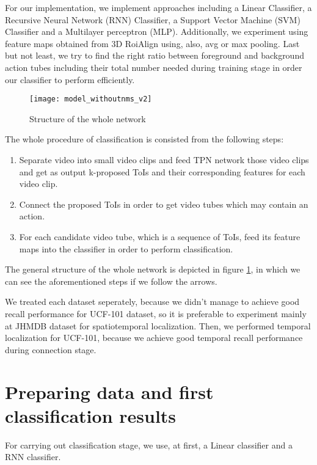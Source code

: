 For our implementation, we implement approaches including a Linear Classifier, 
a Recursive Neural Network (RNN) Classifier, a Support Vector Machine (SVM) Classifier and a Multilayer perceptron (MLP).
Additionally, we experiment using feature maps obtained from 3D RoiAlign using, also, avg or max pooling. Last but not least, we try to
find the right ratio between foreground and background action tubes including their total number needed during training stage
in order our classifier to perform efficiently.

\begin{figure}[h]
  \centering
  \texttt{[image: model\_withoutnms\_v2]}
  \caption{Structure of the whole network}
  \label{fig:whole_network}
\end{figure}

The whole procedure of classification is consisted from the following steps:
\begin{enumerate}
\item Separate video into small video clips and feed TPN network those video clips and get as output
  k-proposed ToIs and their corresponding features for each video clip.
\item Connect the proposed ToIs in order to get video tubes which may contain an action.
\item For each candidate video tube, which is a sequence of ToIs, feed its feature maps  into the classifier
  in order to perform classification.
\end{enumerate}

The general structure of the whole network is depicted in figure \ref{fig:whole_network}, in which we can see the aforementioned steps if we
follow the arrows.  \par
We treated each dataset seperately, because we didn't manage to achieve good recall performance for UCF-101 dataset, so it is preferable to
experiment mainly at JHMDB dataset for spatiotemporal localization. Then, we performed temporal localization for UCF-101, because we achieve
good temporal recall performance during connection stage.

\section{Preparing data  and first classification results}

For carrying out classification stage, we use, at first, a Linear classifier and a RNN classifier.
